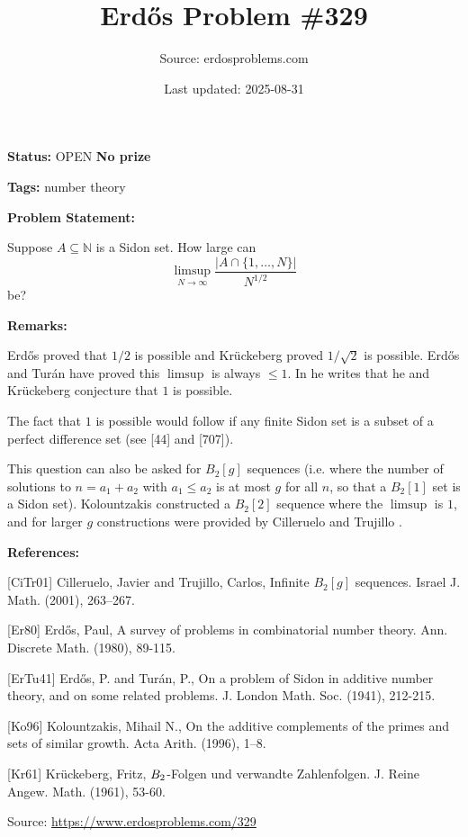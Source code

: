\documentclass{article}
\title{Erd\H{o}s Problem \#329}
\date{Last updated: 2025-08-31}
\author{Source: erdosproblems.com}
\begin{document}
\maketitle

\noindent\textbf{Status:} OPEN \quad \textbf{No prize}

\noindent\textbf{Tags:} number theory

\medskip
\noindent\textbf{Problem Statement:}

Suppose $A\subseteq \mathbb{N}$ is a Sidon set. How large can\[\limsup_{N\to \infty}\frac{\lvert A\cap \{1,\ldots,N\}\rvert}{N^{1/2}}\]be?

\bigskip
\noindent\textbf{Remarks:}

Erd\H{o}s proved that $1/2$ is possible and Kr\"{u}ckeberg \cite{Kr61} proved $1/\sqrt{2}$ is possible. Erd\H{o}s and Tur\'{a}n \cite{ErTu41} have proved this $\limsup$ is always $\leq 1$. In \cite{Er80} he writes that he and Kr\"{u}ckeberg conjecture that $1$ is possible.

The fact that $1$ is possible would follow if any finite Sidon set is a subset of a perfect difference set (see [44] and [707]).

This question can also be asked for $B_2[g]$ sequences (i.e. where the number of solutions to $n=a_1+a_2$ with $a_1\leq a_2$ is at most $g$ for all $n$, so that a $B_2[1]$ set is a Sidon set). Kolountzakis \cite{Ko96} constructed a $B_2[2]$ sequence where the $\limsup$ is $1$, and for larger $g$ constructions were provided by Cilleruelo and Trujillo \cite{CiTr01}.

\bigskip
\noindent\textbf{References:}

[CiTr01] Cilleruelo, Javier and Trujillo, Carlos, Infinite {$B_2[g]$} sequences. Israel J. Math. (2001), 263--267.
 
 [Er80] Erd\H{o}s, Paul, A survey of problems in combinatorial number theory. Ann. Discrete Math. (1980), 89-115.
 
 [ErTu41] Erd\H{o}s, P. and Tur\'{a}n, P., On a problem of Sidon in additive number theory, and on some related problems. J. London Math. Soc. (1941), 212-215.
 
 [Ko96] Kolountzakis, Mihail N., On the additive complements of the primes and sets of similar
growth. Acta Arith. (1996), 1--8.
 
 [Kr61] Kr\"{u}ckeberg, Fritz, $B\sb{2}$-Folgen und verwandte Zahlenfolgen. J. Reine Angew. Math. (1961), 53-60.

\bigskip
\noindent\small{Source: \url{https://www.erdosproblems.com/329}}
\end{document}
